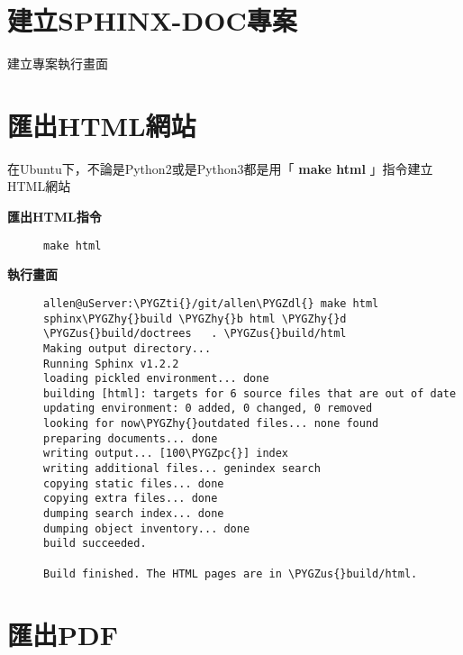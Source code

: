 \documentclass[letterpaper,10pt,english]{sphinxmanual}
\def\PYGZus{\char`\_}
\def\PYGZpc{\char`\%}
\def\PYGZdl{\char`\$}
\def\PYGZhy{\char`\-}
\def\PYGZti{\char`\~}
\begin{document}
\section{建立SPHINX-DOC專案}
\label{_doc/sphinx-doc/index:id4}
建立專案執行畫面


\section{匯出HTML網站}
\label{_doc/sphinx-doc/index:html}
在Ubuntu下，不論是Python2或是Python3都是用「 \textbf{make html} 」指令建立HTML網站
\begin{description}
\item[{\textbf{匯出HTML指令}}] \leavevmode
\begin{Verbatim}[commandchars=\\\{\}]
make html
\end{Verbatim}

\item[{\textbf{執行畫面}}] \leavevmode
\begin{Verbatim}[commandchars=\\\{\}]
allen@uServer:\PYGZti{}/git/allen\PYGZdl{} make html
sphinx\PYGZhy{}build \PYGZhy{}b html \PYGZhy{}d \PYGZus{}build/doctrees   . \PYGZus{}build/html
Making output directory...
Running Sphinx v1.2.2
loading pickled environment... done
building [html]: targets for 6 source files that are out of date
updating environment: 0 added, 0 changed, 0 removed
looking for now\PYGZhy{}outdated files... none found
preparing documents... done
writing output... [100\PYGZpc{}] index
writing additional files... genindex search
copying static files... done
copying extra files... done
dumping search index... done
dumping object inventory... done
build succeeded.

Build finished. The HTML pages are in \PYGZus{}build/html.
\end{Verbatim}

\end{description}


\section{匯出PDF}
\label{_doc/sphinx-doc/index:pdf}
\end{document}
